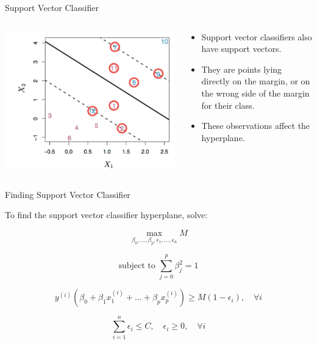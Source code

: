 \begin{frame}{Support Vector Classifier}
\begin{columns}
  \begin{column}{0.5\textwidth}
    \includegraphics[width=\linewidth]{images/support-vector-machines/support-vector-machines-13.png}
  \end{column}
  \begin{column}{0.5\textwidth}
    \begin{itemize}
      \item Support vector classifiers also have support vectors.
      \item They are points lying directly on the margin, or on the wrong side of the margin for their class.
      \item These observations affect the hyperplane.
    \end{itemize}
  \end{column}
\end{columns}
\end{frame}



\begin{frame}{Finding Support Vector Classifier}
    \begin{itemsize}
        \item To find the support vector classifier hyperplane, solve:
    \end{itemsize}

    \[
    \max_{\beta_0, \ldots, \beta_p, \epsilon_1, \ldots, \epsilon_n} M
    \]

    \[
    \text{subject to } \sum_{j=0}^{p} \beta_j^2 = 1
    \]

    \[
    y^{(i)} \left( \beta_0 + \beta_1 x_1^{(i)} + \ldots + \beta_p x_p^{(i)} \right) \geq M (1 - \epsilon_i), \quad \forall i
    \]

    \[
    \sum_{i=1}^{n} \epsilon_i \leq C, \quad \epsilon_i \geq 0, \quad \forall i
    \]
\end{frame}


